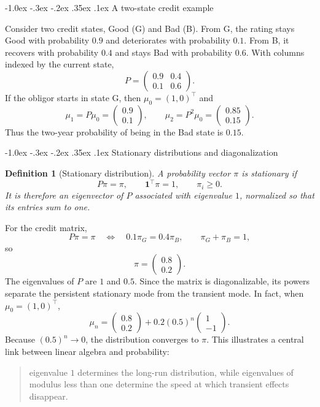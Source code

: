 \documentclass[10pt]{article}
\makeatletter
\renewcommand\subsection{\@startsection{subsection}{2}{\z@}%
  {-1.0ex \@plus -.3ex \@minus -.2ex}%
  {.35ex \@plus .1ex}%
  {\normalfont\normalsize\bfseries}}
\theoremstyle{compactdefinition}
\newtheorem{definition}{Definition}[section]
\theoremstyle{compactproposition}
\makeatother
\begin{document}
\subsection{A two-state credit example}

Consider two credit states, Good (G) and Bad (B). From G, the rating stays Good
with probability $0.9$ and deteriorates with probability $0.1$. From B, it
recovers with probability $0.4$ and stays Bad with probability $0.6$. With
columns indexed by the current state,
\[
P=
\begin{pmatrix}
0.9&0.4\\
0.1&0.6
\end{pmatrix}.
\]
If the obligor starts in state G, then $\mu_0=(1,0)^\top$ and
\[
\mu_1=P\mu_0=
\begin{pmatrix}0.9\\0.1\end{pmatrix},
\qquad
\mu_2=P^2\mu_0=
\begin{pmatrix}0.85\\0.15\end{pmatrix}.
\]
Thus the two-year probability of being in the Bad state is $0.15$.

\subsection{Stationary distributions and diagonalization}

\begin{definition}[Stationary distribution]
A probability vector $\pi$ is stationary if
\[
P\pi=\pi,
\qquad
\mathbf{1}^\top\pi=1,
\qquad
\pi_i\geq0.
\]
It is therefore an eigenvector of $P$ associated with eigenvalue $1$, normalized
so that its entries sum to one.
\end{definition}

For the credit matrix,
\[
P\pi=\pi
\quad\Longleftrightarrow\quad
0.1\pi_G=0.4\pi_B,
\qquad
\pi_G+\pi_B=1,
\]
so
\[
\pi=\begin{pmatrix}0.8\\0.2\end{pmatrix}.
\]
The eigenvalues of $P$ are $1$ and $0.5$. Since the matrix is diagonalizable,
its powers separate the persistent stationary mode from the transient mode. In
fact, when $\mu_0=(1,0)^\top$,
\[
\mu_n
=\begin{pmatrix}0.8\\0.2\end{pmatrix}
+0.2(0.5)^n\begin{pmatrix}1\\-1\end{pmatrix}.
\]
Because $(0.5)^n\to0$, the distribution converges to $\pi$. This illustrates a
central link between linear algebra and probability:
\begin{quote}
eigenvalue $1$ determines the long-run distribution, while eigenvalues of
modulus less than one determine the speed at which transient effects disappear.
\end{quote}
\end{document}
